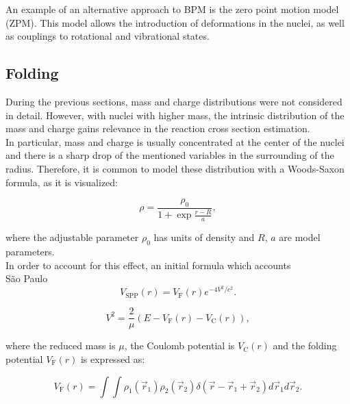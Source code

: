 \documentclass[openany]{book}
\begin{document}
An example of an alternative approach to BPM is the zero point motion model (ZPM). This model allows the introduction of deformations in the nuclei, as well as couplings to rotational and vibrational states. 


\subsection{Folding} \label{sub:potential_folding}

During the previous sections, mass and charge distributions were not considered in detail. However, with nuclei with higher mass, the intrinsic distribution of the mass and charge gains relevance in the reaction cross section estimation. \\

In particular, mass and charge is usually concentrated at the center of the nuclei and there is a sharp drop of the mentioned variables in the surrounding of the radius. Therefore, it is common to model these distribution with a Woods-Saxon formula, as it is visualized: 

\begin{equation}
	\rho = \frac{\rho_0}{1 + \exp{\frac{r - R}{a}}},
\end{equation}

where the adjustable parameter $\rho_0$ has units of density and $R$, $a$ are model parameters. \\

In order to account for this effect, an initial formula which accounts  \\

São Paulo \cite{chamon_2007} \\

\begin{equation} \label{eq:potential_SaoPaulo}
	V_{\mathrm{SPP}} (r) = V_{\mathrm{F}} (r)e^{-4V^2/c^2}.
\end{equation}

\begin{equation} \label{eq:potential_SaoPaulo_speed}
	V^2 = \frac{2}{\mu} \left( E - V_{\mathrm{F}}(r) - V_{\mathrm{C}}(r) \right),
\end{equation}

where the reduced mass is $\mu$, the Coulomb potential is $V_{\mathrm{C}}(r)$ and the folding potential  $V_{\mathrm{F}}(r)$ is expressed as:


\begin{equation} \label{eq:potential_SaoPaulo_folding}
	V_{\mathrm{F}}(r) = \int \int \rho_1(\vec r_1)  \rho_2(\vec r_2) \delta(\vec r - \vec r_1 +  \vec r_2) {d\vec{r}_1}  {d\vec{r}_2}.
\end{equation}
\end{document}
